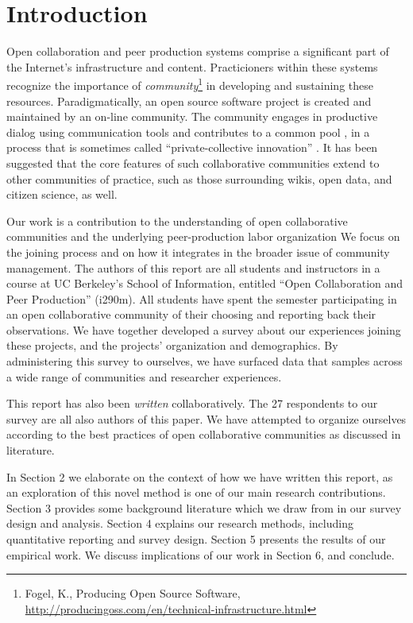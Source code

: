 \section{Introduction}

Open collaboration and peer production systems comprise a significant
part of the Internet's infrastructure and content.
Practicioners within these systems recognize the importance of
\emph{community}\footnote{Fogel, K., Producing Open Source Software, \url{http://producingoss.com/en/technical-infrastructure.html}} in developing and sustaining these resources.
Paradigmatically, an open source software project is created and maintained by an on-line community.
The community engages in productive dialog using communication tools and contributes to
a common pool \cite{ostrom1990}, in a process that is sometimes called ``private-collective innovation'' \cite{vonhippel2003oss}.
It has been suggested that the core features of such collaborative
communities extend to other communities of practice, such as those
surrounding wikis, open data, and citizen science, as well.

Our work is a contribution to the understanding of  open collaborative
communities and the underlying peer-production labor organization \cite{benkler2002}
We focus on the joining process and on how
it integrates in the broader issue of community management.
The authors of this report are all students and instructors in a
course at UC Berkeley's School of Information, entitled ``Open Collaboration and Peer Production'' (i290m).
All students have spent the semester participating in an open
collaborative community of their choosing and reporting back
their observations.
We have together developed a survey about our experiences joining
these projects, and the projects' organization and demographics.
By administering this survey to ourselves, we have surfaced data
that samples across a wide range of communities and researcher experiences.

This report has also been \emph{written} collaboratively.
The 27 respondents  to our survey are all also authors of this paper.
We have attempted to organize ourselves according
to the best practices of open collaborative communities as discussed in literature.


In Section 2 we elaborate on the context of how we have written this report, as an exploration of this novel method is one of our main research contributions.
Section 3 provides some background literature which we draw from in
our survey design and analysis.
Section 4 explains our research methods, including quantitative
reporting and survey design.
Section 5 presents the results of our empirical work.
We discuss implications of our work in Section 6, and conclude. 


